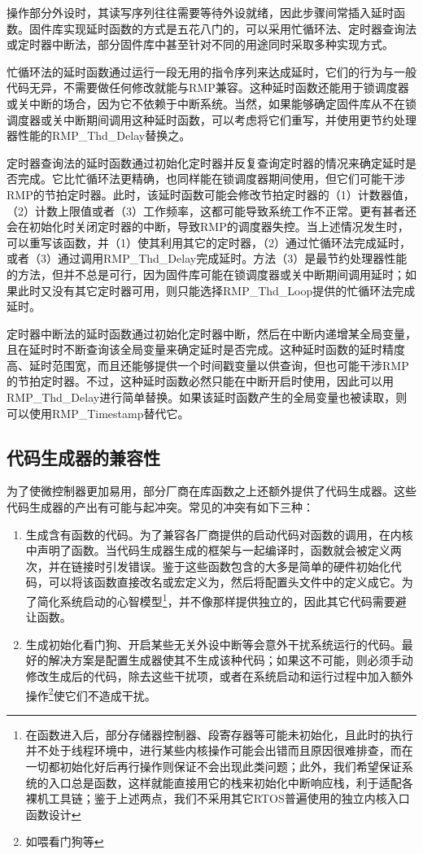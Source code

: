操作部分外设时，其读写序列往往需要等待外设就绪，因此步骤间常插入延时函数。固件库实现延时函数的方式是五花八门的，可以采用忙循环法、定时器查询法或定时器中断法，部分固件库中甚至针对不同的用途同时采取多种实现方式。

忙循环法的延时函数通过运行一段无用的指令序列来达成延时，它们的行为与一般代码无异，不需要做任何修改就能与RMP兼容。这种延时函数还能用于锁调度器或关中断的场合，因为它不依赖于中断系统。当然，如果能够确定固件库从不在锁调度器或关中断期间调用这种延时函数，可以考虑将它们重写，并使用更节约处理器性能的RMP\_Thd\_Delay替换之。

定时器查询法的延时函数通过初始化定时器并反复查询定时器的情况来确定延时是否完成。它比忙循环法更精确，也同样能在锁调度器期间使用，但它们可能干涉RMP的节拍定时器。此时，该延时函数可能会修改节拍定时器的（1）计数器值，（2）计数上限值或者（3）工作频率，这都可能导致系统工作不正常。更有甚者还会在初始化时关闭定时器的中断，导致RMP的调度器失控。当上述情况发生时，可以重写该函数，并（1）使其利用其它的定时器，（2）通过忙循环法完成延时，或者（3）通过调用RMP\_Thd\_Delay完成延时。方法（3）是最节约处理器性能的方法，但并不总是可行，因为固件库可能在锁调度器或关中断期间调用延时；如果此时又没有其它定时器可用，则只能选择RMP\_Thd\_Loop提供的忙循环法完成延时。

定时器中断法的延时函数通过初始化定时器中断，然后在中断内递增某全局变量，且在延时时不断查询该全局变量来确定延时是否完成。这种延时函数的延时精度高、延时范围宽，而且还能够提供一个时间戳变量以供查询，但也可能干涉RMP的节拍定时器。不过，这种延时函数必然只能在中断开启时使用，因此可以用RMP\_Thd\_Delay进行简单替换。如果该延时函数产生的全局变量也被读取，则可以使用RMP\_Timestamp替代它。

\subsection{代码生成器的兼容性}\label{subsec:code-generator-compatibility}

为了使微控制器更加易用，部分厂商在库函数之上还额外提供了代码生成器。这些代码生成器的产出有可能与起冲突。常见的冲突有如下三种：

\begin{enumerate}
\def\labelenumi{\arabic{enumi}.}
\item
  生成含有函数的代码。为了兼容各厂商提供的启动代码对函数的调用，在内核中声明了函数。当代码生成器生成的框架与一起编译时，函数就会被定义两次，并在链接时引发错误。鉴于这些函数包含的大多是简单的硬件初始化代码，可以将该函数直接改名或宏定义为，然后将配置头文件中的定义成它。为了简化系统启动的心智模型\footnote{在函数进入后，部分存储器控制器、段寄存器等可能未初始化，且此时的执行并不处于线程环境中，进行某些内核操作可能会出错而且原因很难排查，而在一切都初始化好后再行操作则保证不会出现此类问题；此外，我们希望保证系统的入口总是函数，这样就能直接用它的栈来初始化中断响应栈，利于适配各裸机工具链；鉴于上述两点，我们不采用其它RTOS普遍使用的独立内核入口函数设计}，并不像那样提供独立的，因此其它代码需要避让函数。
\item
  生成初始化看门狗、开启某些无关外设中断等会意外干扰系统运行的代码。最好的解决方案是配置生成器使其不生成该种代码；如果这不可能，则必须手动修改生成后的代码，除去这些干扰项，或者在系统启动和运行过程中加入额外操作\footnote{如喂看门狗等}使它们不造成干扰。
\end{enumerate}

